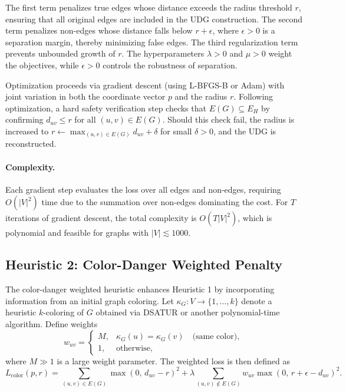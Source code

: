 \documentclass[11pt]{article}
\begin{document}
The first term penalizes true edges whose distance exceeds the radius threshold $r$, ensuring that all original edges are included in the UDG construction. The second term penalizes non-edges whose distance falls below $r+\epsilon$, where $\epsilon>0$ is a separation margin, thereby minimizing false edges. The third regularization term prevents unbounded growth of $r$. The hyperparameters $\lambda>0$ and $\mu>0$ weight the objectives, while $\epsilon>0$ controls the robustness of separation.

Optimization proceeds via gradient descent (using L-BFGS-B or Adam) with joint variation in both the coordinate vector $p$ and the radius $r$. Following optimization, a hard safety verification step checks that $E(G)\subseteq E_H$ by confirming $d_{uv}\le r$ for all $(u,v)\in E(G)$. Should this check fail, the radius is increased to $r\leftarrow \max_{(u,v)\in E(G)} d_{uv}+\delta$ for small $\delta>0$, and the UDG is reconstructed.

\paragraph{Complexity.}
Each gradient step evaluates the loss over all edges and non-edges, requiring $O(|V|^2)$ time due to the summation over non-edges dominating the cost. For $T$ iterations of gradient descent, the total complexity is $O(T|V|^2)$, which is polynomial and feasible for graphs with $|V|\lesssim 1000$.

\newpage

\subsection{Heuristic 2: Color-Danger Weighted Penalty}

The color-danger weighted heuristic enhances Heuristic 1 by incorporating information from an initial graph coloring. Let $\kappa_G : V \to \{1,\dots,k\}$ denote a heuristic $k$-coloring of $G$ obtained via DSATUR or another polynomial-time algorithm. Define weights
\[
w_{uv}=\begin{cases}
M, & \kappa_G(u)=\kappa_G(v)\quad\text{(same color)},\\
1, & \text{otherwise},
\end{cases}
\]
where $M\gg 1$ is a large weight parameter. The weighted loss is then defined as
\[
L_{\mathrm{color}}(p,r)
=
\sum_{(u,v)\in E(G)} \max(0,\, d_{uv}-r)^2
+
\lambda\sum_{(u,v)\notin E(G)} w_{uv} \max(0,\, r+\epsilon-d_{uv})^2.
\]
\end{document}
